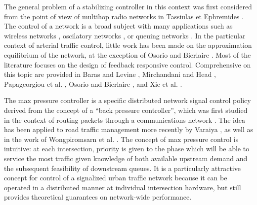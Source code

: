 The general problem of a stabilizing controller in this context was first considered from the point of view of multihop radio networks in Tassiulas et Ephremides \cite{MaxPressureOriginal}. The control of a network is a broad subject with many applications such as wireless networks \cite{StabRelayNetworks}\cite{ControlWireless}, oscilatory networks \cite{SynchroComplexNetworks}, or queuing networks \cite{MultiQueues}\cite{CDC03OptSwitch}. In the particular context of arterial traffic control, little work has been made on the approximation equilibrium of the network, at the exception of Osorio and Bierlaire \cite{ModelSignalOpt}\cite{ModelFiniteNetwork}. Most of the literature focuses on the design of feedback responsive control. Comprehensive on this topic are provided in
Baras and Levine \cite{NetworkBarasOne}\cite{NetworkBarasTwo}, Mirchandani and Head \cite{Mirchandani}, Papageorgiou et al. \cite{Papageorgiou}, Osorio and Bierlaire \cite{ModelSignalOpt}, and Xie et al. \cite{Xie}.

The max pressure controller is a specific distributed network signal control policy derived from the concept of a ``back pressure controller'', which was first studied in the context of routing packets through a communications network \cite{MaxPressureOriginal}. The idea has been applied to road traffic management more recently by Varaiya \cite{MaxPressureStochastic}, as well as in the work of Wongpiromsarn et al. \cite{MaxPressureStochasticConcurrent}. The concept of max pressure control is intuitive: at each intersection, priority is given to the phase which will be able to service the most traffic given knowledge of both available upstream demand and the subsequent feasibility of downstream queues. It is a particularly attractive concept for control of a signalized urban traffic network because it can be operated in a distributed manner at individual intersection hardware, but still provides theoretical guarantees on network-wide performance. 


